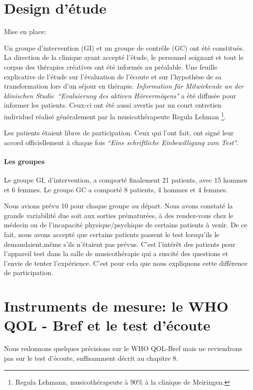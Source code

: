 \section{Design d'étude}

Mise en place:

Un groupe d'intervention (GI) et un groupe de contrôle (GC) ont été constitués.
La direction de la clinique ayant accepté l'étude, le personnel soignant et tout le
corpus des thérapies créatives ont  été
informés au préalable.
Une feuille explicative de l'étude sur  l'évaluation de l'écoute et
sur
l'hypothèse de sa transformation lors d'un 
séjour en thérapie. \emph{Information für Mitwirkende an der klinischen
  Studie\  ``Evaluierung des aktiven Hörvermögens" } a été diffusée pour informer les patients.
Ceux-ci ont été aussi avertis par un
court entretien individuel réalisé généralement par la musicothérapeute Regula Lehman  \footnote{Regula
  Lehmann, musicothérapeute  à 90\%  à la clinique de Meiringen.}.

Les patients étaient libres de participation. Ceux qui
l'ont fait, ont signé leur accord  officiellement à chaque fois  \emph{``Eine schriftliche Einbewilligung zum
  Test"}.

\paragraph{Les groupes}

Le groupe GI, d'intervention, a comporté finalement 21 patients, avec 15 hommes et 6
femmes.
Le groupe GC a comporté 8 patients, 4 hommes et 4 femmes.

Nous avions prévu 10 pour chaque groupe au départ. Nous avons
constaté la grande 
variabilité due soit aux sorties prématurées, à des rendez-vous chez le médecin
ou de l'incapacité physique/psychique de certains patients à venir. De
ce fait,
nous avons accepté que certains patients passent le test lorsqu'ils le
demandaient,même s'ils
n'étaient pas prévus. C'est l'intérêt des patients pour l'appareil
test dans la salle de musicothérapie qui a suscité des questions et
l'envie de tenter l'expérience. C'est pour cela que nous expliquons
cette différence de participation.

 
 
 

\section{Instruments de mesure: le WHO QOL - Bref et le test d'écoute}
 Nous redonnons quelques précisions sur le WHO QOL-Bref mais ne
 reviendrons pas sur le test d'écoute, suffisamment décrit au chapitre 8.

